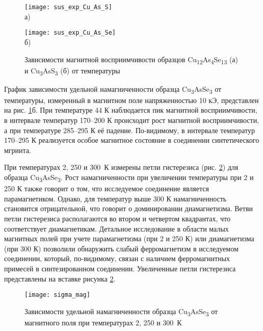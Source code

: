 \begin{figure}[p!]
  \begin{minipage}[ht]{0.9\linewidth}\centering
    \texttt{[image: sus\_exp\_Cu\_As\_S]} \\ а)
  \end{minipage}
 \vfill
  \begin{minipage}[ht]{0.9\linewidth}\centering
    \texttt{[image: sus\_exp\_Cu\_As\_Se]} \\ б)
  \end{minipage}
      \caption[Зависимости магнитной восприимчивости образцов Cu\textsubscript{12}As\textsubscript{4}Se\textsubscript{13} (а) и Cu\textsubscript{3}AsS\textsubscript{3} (б) от температуры]{Зависимости магнитной восприимчивости образцов Cu\textsubscript{12}As\textsubscript{4}Se\textsubscript{13} (а) и Cu\textsubscript{3}AsS\textsubscript{3} (б) от температуры}
    \label{img:magsus1}
\end{figure}

График зависимости удельной намагниченности образца Cu\textsubscript{3}AsSe\textsubscript{3} от температуры, измеренный в магнитном поле напряженностью 10 кЭ, представлен на рис. \ref{img:magsus1}б.
При температуре 44 К наблюдается пик магнитной восприимчивости, в интервале температур 170--200 К происходит рост магнитной восприимчивости, а при температуре 285--295 К её падение.
По-видимому, в интервале температур 170--295 К реализуется особое магнитное состояние в соединении синтетического мгриита.

При температурах 2, 250 и 300~К измерены петли гистерезиса (рис. \ref{img:magsus3}) для образца Cu\textsubscript{3}AsSe\textsubscript{3}.
Рост намагниченности при увеличении температуры при 2 и 250 К также говорит о
том, что исследуемое соединение является парамагнетиком.
Однако, для температур выше 300 К намагниченность становится отрицательной, что
говорит о доминировании диамагнетизма.
 Ветви петли гистерезиса располагаются во втором и четвертом квадрантах, что соответствует диамагнетикам.
Детальное исследование в области малых магнитных полей при учете парамагнетизма (при 2 и 250 К) или диамагнетизма (при 300 К) позволили обнаружить слабый ферромагнетизм в исследуемом соединении, который, по-видимому, связан с наличием ферромагнитных примесей в синтезированном соединении.
Увеличенные петли гистерезиса представлены на вставке рисунка \ref{img:magsus3}.



\begin{figure}[pt!]
  \begin{minipage}[ht]{0.9\linewidth}\centering
    \texttt{[image: sigma\_mag]} \\
  \end{minipage}

      \caption[Зависимости удельной намагниченности образца  Cu\textsubscript{3}AsSe\textsubscript{3} от магнитного поля при температурах 2, 250 и 300~К]{Зависимости удельной намагниченности образца  Cu\textsubscript{3}AsSe\textsubscript{3} от магнитного поля при температурах 2, 250 и 300~К}
    \label{img:magsus3}
\end{figure}


